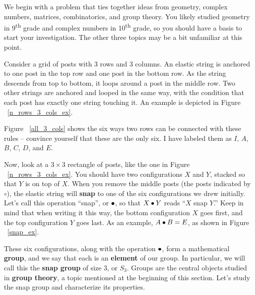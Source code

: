 \documentclass[../gatm.tex]{subfiles}
\begin{document}

\noindent We begin with a problem that ties together ideas from geometry, complex numbers, matrices, combinatorics, and group theory. You likely studied geometry in 9\textsuperscript{th} grade and complex numbers in 10\textsuperscript{th} grade, so you should have a basis to start your investigation. The other three topics may be a bit unfamiliar at this point.

Consider a grid of posts with $3$ rows and $3$ columns. An elastic string is anchored to one post in the top row and one post in the bottom row. As the string descends from top to bottom, it loops around a post in the middle row. Two other strings are anchored and looped in the same way, with the condition that each post has exactly one string touching it. An example is depicted in Figure ~\ref{n_rows_3_cols_ex}.

Figure ~\ref{all_3_cols} shows the six ways two rows can be connected with these rules -- convince yourself that these are the only six. I have labeled them as $I$, $A$, $B$, $C$, $D$, and $E$.



Now, look at a $3\times 3$ rectangle of posts, like the one in Figure ~\ref{n_rows_3_cols_ex}. You should have two configurations $X$ and $Y$, stacked so that $Y$ is on top of $X$. When you remove the middle posts (the posts indicated by $\circ$), the elastic string will \textbf{snap} to one of the six configurations we drew initially. Let's call this operation ``snap'', or $\bullet$, so that $X\bullet Y$ reads ``$X$ snap $Y$.'' Keep in mind that when writing it this way, the bottom configuration $X$ goes first, and the top configuration $Y$ goes last. As an example, $A\bullet B = E$, as shown in Figure ~\ref{snap_ex}.

These six configurations, along with the operation $\bullet$, form a mathematical \textbf{group}, and we say that each is an \textbf{element} of our group. In particular, we will call this the \textbf{snap group} of size $3$, or $S_3$. Groups are the central objects studied in \textbf{group theory}, a topic mentioned at the beginning of this section. Let's study the snap group and characterize its properties.
\end{document}

